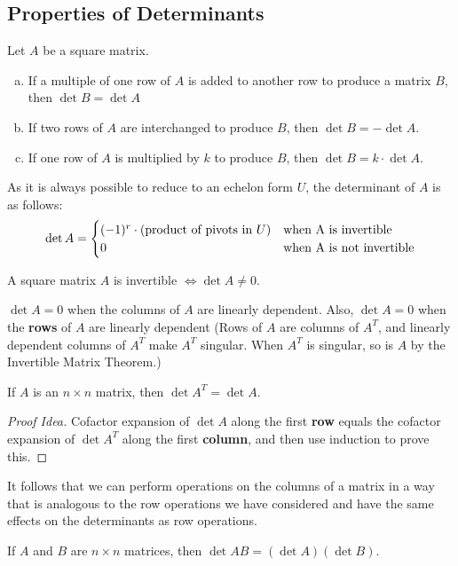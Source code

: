 \documentclass[11pt]{scrartcl}
\theoremstyle{dotlessP}
\theoremstyle{dotlessN}
\begin{document}
\subsection{Properties of Determinants}
\begin{theorem}
	Let $A$ be a square matrix.
	\begin{enumerate}[a.]
		\item If a multiple of one row of $A$ is added to another row to produce a matrix $B$, then $\det B = \det A$
		\item If two rows of $A$ are interchanged to produce $B$, then $\det B = - \det A$.
		\item If one row of $A$ is multiplied by $k$ to produce $B$, then $\det B = k \cdot \det A$.
	\end{enumerate}
\end{theorem}
\begin{remark}
	As it is always possible to reduce to an echelon form $U$, the determinant of $A$ is as follows:
	\[
	\det A = 
	\begin{cases}
		(-1)^r \cdot (\text{product of pivots in } U) & \text{when } $A$ \text{ is invertible} \\
		0 & \text{when } $A$ \text{ is not invertible}

	\end{cases}
	\] 
\end{remark}
\begin{theorem}
	A square matrix $A$ is invertible $\iff \det A \neq 0$.
\end{theorem}
\begin{corollary}
	$\det A = 0$ when the columns of $A$ are linearly dependent. Also, $\det A = 0$ when the \textbf{rows} of $A$ are linearly dependent (Rows of $A$ are columns of $A^T$, and linearly dependent columns of  $A^T$ make $A^T$ singular. When $A^T$ is singular, so is $A$ by the Invertible Matrix Theorem.) 
\end{corollary}
\begin{theorem}
	If $A$ is an $n \times n$ matrix, then $\det A^T = \det A$.
\end{theorem}
\begin{proof}
	[Proof Idea]
	Cofactor expansion of $\det A$ along the first \textbf{row} equals the cofactor expansion of $\det A^T$ along the first \textbf{column}, and then use induction to prove this.
\end{proof}
\begin{remark}
	It follows that we can perform operations on the columns of a matrix in a way that is analogous to the row operations we have considered and have the same effects on the determinants as row operations.
\end{remark}
\begin{theorem}
	If $A$ and $B$ are $n \times n$ matrices, then $\det AB = (\det A)(\det B)$.
\end{theorem}
\end{document}

